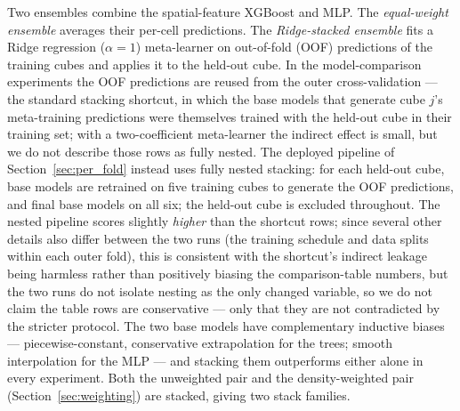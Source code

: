 \documentclass[fleqn,usenatbib]{rasti}
\begin{document}
Two ensembles combine the spatial-feature XGBoost and MLP. The
\emph{equal-weight ensemble} averages their per-cell predictions. The
\emph{Ridge-stacked ensemble} fits a Ridge regression (\(\alpha = 1\))
meta-learner on out-of-fold (OOF) predictions of the training cubes and
applies it to the held-out cube. In the model-comparison experiments the
OOF predictions are reused from the outer cross-validation --- the
standard stacking shortcut, in which the base models that generate cube
\(j\)'s meta-training predictions were themselves trained with the
held-out cube in their training set; with a two-coefficient meta-learner
the indirect effect is small, but we do not describe those rows as fully
nested. The deployed pipeline of Section~\ref{sec:per_fold} instead uses
fully nested stacking: for each held-out cube, base models are retrained
on five training cubes to generate the OOF predictions, and final base
models on all six; the held-out cube is excluded throughout. The nested
pipeline scores slightly \emph{higher} than the shortcut rows; since
several other details also differ between the two runs (the training
schedule and data splits within each outer fold), this is consistent
with the shortcut's indirect leakage being harmless rather than
positively biasing the comparison-table numbers, but the two runs do
not isolate nesting as the only changed variable, so we do not claim
the table rows are conservative --- only that they are not
contradicted by the stricter protocol. The
two base models have complementary inductive biases ---
piecewise-constant, conservative extrapolation for the trees; smooth
interpolation for the MLP --- and stacking them outperforms either alone
in every experiment. Both the unweighted pair and the density-weighted
pair (Section~\ref{sec:weighting}) are stacked, giving two stack
families.
\end{document}
